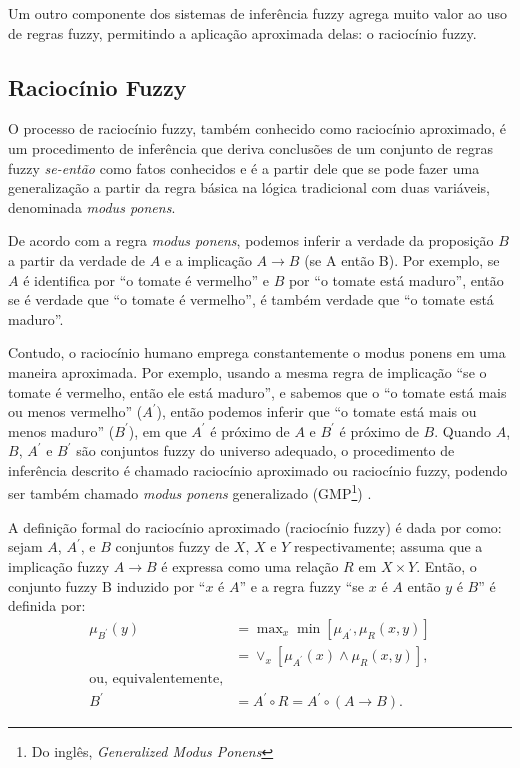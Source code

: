 Um outro componente dos sistemas de inferência fuzzy agrega muito valor ao uso de regras fuzzy, permitindo a aplicação aproximada delas: o raciocínio fuzzy.

\subsection{Raciocínio Fuzzy}
\label{sec:raciocinio_fuzzy}

O processo de raciocínio fuzzy, também conhecido como raciocínio aproximado, é um procedimento de inferência que deriva conclusões de um conjunto de regras fuzzy \textit{se-então} como fatos conhecidos \cite[p.~62]{Jang1997} e é a partir dele que se pode fazer uma generalização a partir da regra básica na lógica tradicional com duas variáveis, denominada \textit{modus ponens}.

De acordo com a regra \textit{modus ponens}, podemos inferir a verdade da proposição $B$ a partir da verdade de $A$ e a implicação $A \rightarrow B$ (se A então B). Por exemplo, se $A$ é identifica por ``o tomate é vermelho'' e $B$ por ``o tomate está maduro'', então se é verdade que ``o tomate é vermelho'', é também verdade que ``o tomate está maduro''.

Contudo, o raciocínio humano emprega constantemente o modus ponens em uma maneira aproximada. Por exemplo, usando a mesma regra de implicação ``se o tomate é vermelho, então ele está maduro'', e sabemos que o ``o tomate está mais ou menos vermelho'' ($A^\prime$), então podemos inferir que ``o tomate está mais ou menos maduro'' ($B^\prime$), em que $A^\prime$ é próximo de $A$ e $B^\prime$ é próximo de $B$. Quando $A$, $B$, $A^\prime$ e $B^\prime$ são conjuntos fuzzy do universo adequado, o procedimento de inferência descrito é chamado raciocínio aproximado ou raciocínio fuzzy, podendo ser também chamado \textit{modus ponens} generalizado (GMP\footnote{Do inglês, \textit{Generalized Modus Ponens}}) \cite[p.~65]{Jang1997}.

A definição formal do raciocínio aproximado (raciocínio fuzzy) é dada por  como: sejam $A$, $A^\prime$, e $B$ conjuntos fuzzy de $X$, $X$ e $Y$ respectivamente; assuma que a implicação fuzzy $A \rightarrow B$ é expressa como uma relação $R$ em $X \times Y$. Então, o conjunto fuzzy B induzido por ``$x$ é $A$'' e a regra fuzzy ``se $x$ é $A$ então $y$ é $B$'' é definida por:
\begin{align*}
\mu_{B^\prime}(y) &= \max\nolimits_x \min[\mu_{A^\prime}, \mu_R(x,y)]
\\
&= \vee_x[\mu_{A^\prime}(x) \wedge \mu_R(x,y)], \\
\mbox{ou, equivalentemente,} \\
B^\prime &= A^\prime \circ R = A^\prime \circ (A \rightarrow B).
\end{align*}
 
